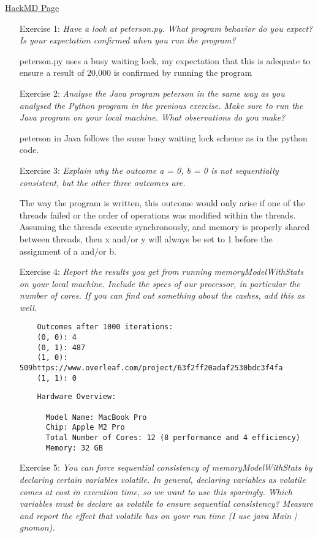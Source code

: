 \documentclass{article}
\theoremstyle{theorem}
\theoremstyle{definition}
\theoremstyle{remark}
\begin{document}
\href{https://hackmd.io/@alexhkurz/ryEdSuVXh}{HackMD Page}\\
\begin{itemize}
    \item[Exercise 1:] \textit{Have a look at peterson.py. What program behavior do you expect? Is your expectation confirmed when you run the program?}
    
    peterson.py uses a busy waiting lock, my expectation that this is adequate to ensure a result of 20,000 is confirmed by running the program

    \item[Exercise 2:] \textit{Analyse the Java program peterson in the same way as you analysed the Python program in the previous exercise. Make sure to run the Java program on your local machine. What observations do you make?}

    peterson in Java follows the same busy waiting lock scheme as in the python code.

    \item[Exercise 3:] \textit{Explain why the outcome
    a = 0, b = 0
    is not sequentially consistent, but the other three outcomes are.}
    
    The way the program is written, this outcome would only arise if one of the threads failed or the order of operations was modified within the threads. Assuming the threads execute synchronously, and memory is properly shared between threads, then x and/or y will always be set to 1 before the assignment of a and/or b. 

    \item[Exercise 4:] \textit{Report the results you get from running memoryModelWithStats on your local machine. Include the specs of our processor, in particular the number of cores. If you can find out something about the cashes, add this as well.}
\begin{verbatim}
    Outcomes after 1000 iterations:
    (0, 0): 4
    (0, 1): 487
    (1, 0): 509https://www.overleaf.com/project/63f2ff20adaf2530bdc3f4fa
    (1, 1): 0
\end{verbatim}

\begin{verbatim}
    Hardware Overview:

      Model Name: MacBook Pro
      Chip: Apple M2 Pro
      Total Number of Cores: 12 (8 performance and 4 efficiency)
      Memory: 32 GB
\end{verbatim}
    

    \item[Exercise 5:] \textit{You can force sequential consistency of memoryModelWithStats by declaring certain variables volatile. In general, declaring variables as volatile comes at cost in execution time, so we want to use this sparingly. Which variables must be declare as volatile to ensure sequential consistency? Measure and report the effect that volatile has on your run time (I use java Main | gnomon).}


\end{itemize}
\end{document}
